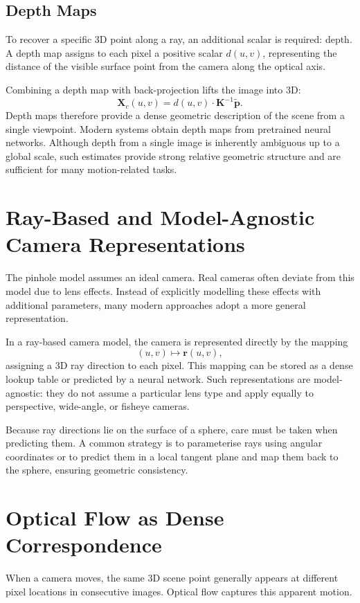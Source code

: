 \subsection{Depth Maps}
To recover a specific 3D point along a ray, an additional scalar is required: depth. A depth map assigns to each pixel a positive scalar $d(u,v)$, representing the distance of the visible surface point from the camera along the optical axis.

Combining a depth map with back-projection lifts the image into 3D:
\begin{equation}
    \mathbf{X}_c(u,v) = d(u,v) \cdot \mathbf{K}^{-1} \tilde{\mathbf{p}}.
\end{equation}
Depth maps therefore provide a dense geometric description of the scene from a single viewpoint. Modern systems obtain depth maps from pretrained neural networks. Although depth from a single image is inherently ambiguous up to a global scale, such estimates provide strong relative geometric structure and are sufficient for many motion-related tasks.

\section{Ray-Based and Model-Agnostic Camera Representations}
The pinhole model assumes an ideal camera. Real cameras often deviate from this model due to lens effects. Instead of explicitly modelling these effects with additional parameters, many modern approaches adopt a more general representation.

In a ray-based camera model, the camera is represented directly by the mapping
\begin{equation}
    (u,v) \mapsto \mathbf{r}(u,v),
\end{equation}
assigning a 3D ray direction to each pixel. This mapping can be stored as a dense lookup table or predicted by a neural network. Such representations are model-agnostic: they do not assume a particular lens type and apply equally to perspective, wide-angle, or fisheye cameras.

Because ray directions lie on the surface of a sphere, care must be taken when predicting them. A common strategy is to parameterise rays using angular coordinates or to predict them in a local tangent plane and map them back to the sphere, ensuring geometric consistency.

\section{Optical Flow as Dense Correspondence}
When a camera moves, the same 3D scene point generally appears at different pixel locations in consecutive images. Optical flow captures this apparent motion.

